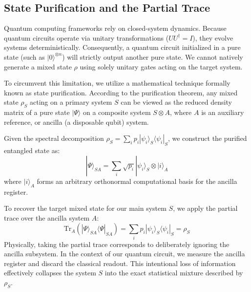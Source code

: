 \documentclass[12pt]{article}
\begin{document}
\subsection{State Purification and the Partial Trace}
Quantum computing frameworks rely on closed-system dynamics. Because quantum circuits operate via unitary transformations ($U U^\dagger = I$), they evolve systems deterministically. Consequently, a quantum circuit initialized in a pure state (such as $|0\rangle^{\otimes n}$) will strictly output another pure state. We cannot natively generate a mixed state $\rho$ using solely unitary gates acting on the target system.

To circumvent this limitation, we utilize a mathematical technique formally known as state purification. According to the purification theorem, any mixed state $\rho_S$ acting on a primary system $S$ can be viewed as the reduced density matrix of a pure state $|\Psi\rangle$ on a composite system $S \otimes A$, where $A$ is an auxiliary reference, or ancilla (a disposable qubit) system.

Given the spectral decomposition $\rho_S = \sum_{i} p_i |\psi_i\rangle_S \langle \psi_i|_S$, we construct the purified entangled state as:
\begin{equation}
    |\Psi\rangle_{SA} = \sum_{i} \sqrt{p_i} |\psi_i\rangle_S \otimes |i\rangle_A
\end{equation}
where $|i\rangle_A$ forms an arbitrary orthonormal computational basis for the ancilla register.

To recover the target mixed state for our main system $S$, we apply the partial trace over the ancilla system $A$:
\begin{equation}
    \text{Tr}_A(|\Psi\rangle_{SA} \langle\Psi|_{SA}) = \sum_{i} p_i |\psi_i\rangle_S \langle \psi_i|_S = \rho_S
\end{equation}
Physically, taking the partial trace corresponds to deliberately ignoring the ancilla subsystem. In the context of our quantum circuit, we measure the ancilla register and discard the classical readout. This intentional loss of information effectively collapses the system $S$ into the exact statistical mixture described by $\rho_S$.
\end{document}
